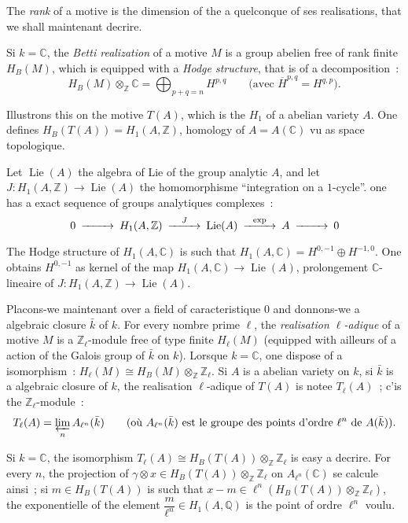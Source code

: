 \documentclass[12pt,a4paper]{article}
\theoremstyle{plain}
\theoremstyle{definition}
\theoremstyle{remark}
\DeclareMathOperator{\Lie}{Lie}
\newcommand{\ZZ}{\mathbb{Z}}
\newcommand{\QQ}{\mathbb{Q}}
\newcommand{\CC}{\mathbb{C}}
\providecommand{\CC}{\mathbb{C}}
\providecommand{\QQ}{\mathbb{Q}}
\providecommand{\ZZ}{\mathbb{Z}}
\providecommand{\Lie}{\operatorname{Lie}}
\begin{document}
The \emph{rank} of a motive is the dimension of the a quelconque of ses realisations, that we shall maintenant decrire.

Si $k = \CC$, the \emph{Betti realization} of a motive $M$ is a group abelien free of rank finite $H_B(M)$, which is equipped with a \emph{Hodge structure}, that is of a decomposition~:
\[
H_B(M) \otimes_\ZZ \CC = \bigoplus_{p+q=n} H^{p,q} \qquad \text{(avec } \overline{H}^{p,q} = H^{q,p}\text{)}.
\]

Illustrons this on the motive $T(A)$, which is the $H_1$ of a abelian variety $A$. One defines $H_B(T(A)) = H_1(A, \ZZ)$, homology of $A = A(\CC)$ vu as space topologique.

Let $\Lie(A)$ the algebra of Lie of the group analytic $A$, and let $J : H_1(A, \ZZ) \to \Lie(A)$ the homomorphisme ``integration on a $1$-cycle''. one has a exact sequence of groups analytiques complexes~:
\begin{equation*}
\begin{CD}
0 @>>> H_1(A, \ZZ) @>{J}>> \Lie(A) @>{\exp}>> A @>>> 0
\end{CD}
\end{equation*}

The Hodge structure of $H_1(A, \CC)$ is such that $H_1(A, \CC) = H^{0,-1} \oplus H^{-1,0}$. One obtains $H^{0,-1}$ as kernel of the map $H_1(A, \CC) \to \Lie(A)$, prolongement $\CC$-lineaire of $J : H_1(A, \ZZ) \to \Lie(A)$.

\bigskip

Placons-we maintenant over a field of caracteristique $0$ and donnons-we a algebraic closure $\bar{k}$ of $k$. For every nombre prime $\ell$, the \emph{realisation $\ell$-adique} of a motive $M$ is a $\ZZ_\ell$-module free of type finite $H_\ell(M)$ (equipped with ailleurs of a action of the Galois group of $\bar{k}$ on $k$). Lorsque $k = \CC$, one dispose of a isomorphism~: $H_\ell(M) \cong H_B(M) \otimes_\ZZ \ZZ_\ell$. Si $A$ is a abelian variety on $k$, si $\bar{k}$ is a algebraic closure of $k$, the realisation $\ell$-adique of $T(A)$ is notee $T_\ell(A)$~; c'is the $\ZZ_\ell$-module~:
\[
T_\ell(A) = \varprojlim_n A_{\ell^n}(\bar{k}) \qquad \text{(où } A_{\ell^n}(\bar{k}) \text{ est le groupe des points d'ordre } \ell^n \text{ de } A(\bar{k})\text{)}.
\]

Si $k = \CC$, the isomorphism $T_\ell(A) \cong H_B(T(A)) \otimes_\ZZ \ZZ_\ell$ is easy a decrire. For every $n$, the projection of $\gamma \otimes x \in H_B(T(A)) \otimes_\ZZ \ZZ_\ell$ on $A_{\ell^n}(\CC)$ se calcule ainsi~; si $m \in H_B(T(A))$ is such that $x - m \in \ell^n (H_B(T(A)) \otimes_\ZZ \ZZ_\ell)$, the exponentielle of the element $\dfrac{m}{\ell^n} \in H_1(A, \QQ)$ is the point of ordre $\ell^n$ voulu.
\end{document}
